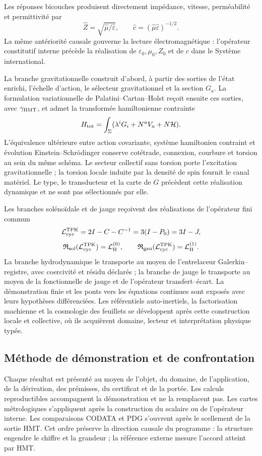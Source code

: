 Les réponses bicouches produisent directement impédance, vitesse,
perméabilité et permittivité par
\[
 \widehat Z=\sqrt{\widehat\mu/\widehat\varepsilon},
 \qquad
 \widehat c=(\widehat\mu\widehat\varepsilon)^{-1/2}.
\]
La même antériorité causale gouverne la lecture électromagnétique : l'opérateur
constitutif interne précède la réalisation de
\(\varepsilon_0,\mu_0,Z_0\) et de \(c\) dans le Système international.

La branche gravitationnelle construit d'abord, à partir des sorties de l'état
enrichi, l'échelle d'action, le sélecteur gravitationnel et la section
\(G_a\). La formulation variationnelle de Palatini--Cartan--Holst reçoit ensuite
ces sorties, avec \(\gamma_{\rm HMT}\), et admet la transformée
hamiltonienne contrainte
\[
 H_{\rm tot}=\int_\Sigma
 (\lambda^i G_i+N^a V_a+N\mathcal H).
\]
L'équivalence ultérieure entre action covariante, système hamiltonien contraint et
évolution Einstein--Schrödinger conserve cotétrade, connexion, courbure et
torsion au sein du même schéma. Le secteur collectif sans torsion porte
l'excitation gravitationnelle ; la torsion locale induite par la densité de spin
fournit le canal matériel. Le type, le transducteur et la carte de \(G\) précèdent
cette réalisation dynamique et ne sont pas sélectionnés par elle.

Les branches solénoïdale et de jauge reçoivent des réalisations de l'opérateur fini commun
\[
 \mathcal L_{\rm cyc}^{\rm TPK}=2I-C-C^{-1}=3(I-P_0)=3I-J,
\]
\[
 \mathfrak R_{\rm sol}(\mathcal L_{\rm cyc}^{\rm TPK})
 =\mathcal L_{\rm H}^{(0)},\qquad
 \mathfrak R_{\rm gau}(\mathcal L_{\rm cyc}^{\rm TPK})
 =\mathcal L_{\rm H}^{(1)}.
\]
La branche hydrodynamique le transporte au moyen de l'entrelaceur
Galerkin--registre, avec coercivité et résidu déclarés ; la branche de jauge le
transporte au moyen de la fonctionnelle de jauge et de l'opérateur
transfert--écart. La démonstration finie et les ponts vers les équations
continues sont exposés avec leurs hypothèses différenciées. Les référentiels
auto-inertiels, la factorisation machienne et la cosmologie des feuillets se
développent après cette construction locale et collective, où ils acquièrent
domaine, lecteur et interprétation physique typée.

\subsection*{Méthode de démonstration et de confrontation}

Chaque résultat est présenté au moyen de l'objet, du domaine, de l'application, de la dérivation,
des prémisses, du certificat et de la portée. Les calculs reproductibles accompagnent la
démonstration et ne la remplacent pas. Les cartes métrologiques s'appliquent après
la construction du scalaire ou de l'opérateur interne. Les comparaisons CODATA et PDG
s'ouvrent après le scellement de la sortie HMT\@. Cet ordre préserve la
direction causale du programme : la structure engendre le chiffre et la grandeur ;
la référence externe mesure l'accord atteint par HMT\@.

